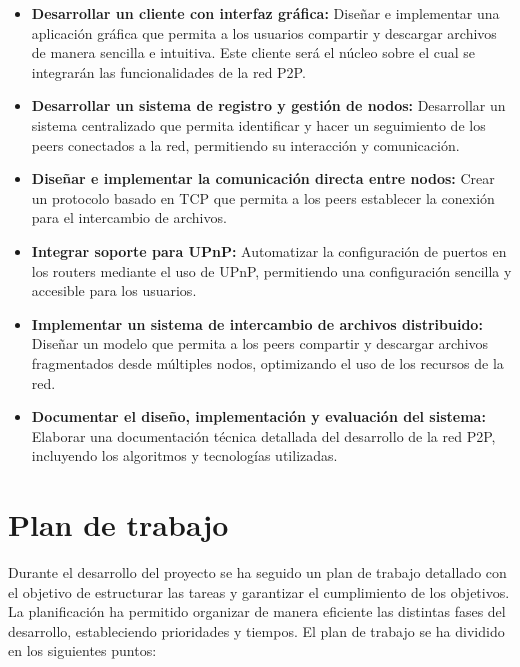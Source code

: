 \begin{itemize}
    \item \textbf{Desarrollar un cliente con interfaz gráfica:} Diseñar e implementar una aplicación gráfica que permita a los usuarios compartir y descargar archivos de manera sencilla e intuitiva. Este cliente será el núcleo sobre el cual se integrarán las funcionalidades de la red P2P.

    \item \textbf{Desarrollar un sistema de registro y gestión de nodos:} Desarrollar un sistema centralizado que permita identificar y hacer un seguimiento de los peers conectados a la red, permitiendo su interacción y comunicación.

    \item \textbf{Diseñar e implementar la comunicación directa entre nodos:} Crear un protocolo basado en TCP que permita a los peers establecer la conexión para el intercambio de archivos.

    \item \textbf{Integrar soporte para UPnP:} Automatizar la configuración de puertos en los routers mediante el uso de UPnP, permitiendo una configuración sencilla y accesible para los usuarios.

    \item \textbf{Implementar un sistema de intercambio de archivos distribuido:} Diseñar un modelo que permita a los peers compartir y descargar archivos fragmentados desde múltiples nodos, optimizando el uso de los recursos de la red.

    \item \textbf{Documentar el diseño, implementación y evaluación del sistema:} Elaborar una documentación técnica detallada del desarrollo de la red P2P, incluyendo los algoritmos y tecnologías utilizadas.

\end{itemize}


\section{Plan de trabajo}

Durante el desarrollo del proyecto se ha seguido un plan de trabajo detallado con el objetivo de estructurar las tareas y garantizar el cumplimiento de los objetivos.
La planificación ha permitido organizar de manera eficiente las distintas fases del desarrollo, estableciendo prioridades y tiempos.
El plan de trabajo se ha dividido en los siguientes puntos:

